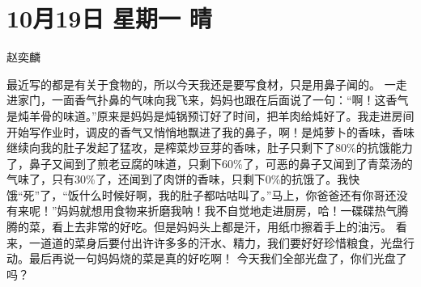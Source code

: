 \section{10月19日 星期一 晴}

赵奕麟

最近写的都是有关于食物的，所以今天我还是要写食材，只是用鼻子闻的。
一走进家门，一面香气扑鼻的气味向我飞来，妈妈也跟在后面说了一句：``啊！这香气是炖羊骨的味道。''原来是妈妈是炖锅预订好了时间，把羊肉给炖好了。我走进房间开始写作业时，调皮的香气又悄悄地飘进了我的鼻子，啊！是炖萝卜的香味，香味继续向我的肚子发起了猛攻，是榨菜炒豆芽的香味，肚子只剩下了80\%的抗饿能力了，鼻子又闻到了煎老豆腐的味道，只剩下60\%了，可恶的鼻子又闻到了青菜汤的气味了，只有30\%了，还闻到了肉饼的香味，只剩下0\%的抗饿了。我快饿``死''了，``饭什么时候好啊，我的肚子都咕咕叫了。''马上，你爸爸还有你哥还没有来呢！''妈妈就想用食物来折磨我呐！我不自觉地走进厨房，哈！一碟碟热气腾腾的菜，看上去非常的好吃。但是妈妈头上都是汗，用纸巾擦着手上的油污。
看来，一道道的菜身后要付出许许多多的汗水、精力，我们要好好珍惜粮食，光盘行动。最后再说一句妈妈烧的菜是真的好吃啊！
今天我们全部光盘了，你们光盘了吗？
